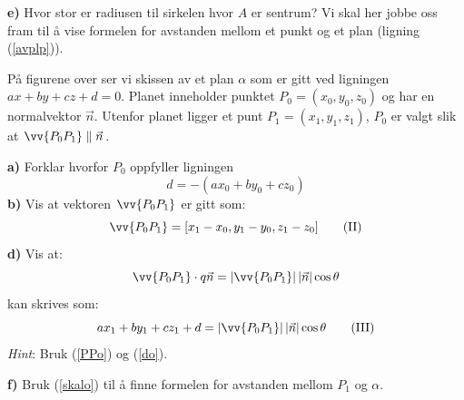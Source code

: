\textbf{e)} Hvor stor er radiusen til sirkelen hvor $ A $ er sentrum?
\newpage
\ekspop
Vi skal her jobbe oss fram til å vise formelen for avstanden mellom et punkt og et plan (ligning (\ref{avplp})).\vs
\begin{figure}[H]
	\centering
	\qquad\quad	
\end{figure}
På figurene over ser vi skissen av et plan $ \alpha $ som er gitt ved ligningen $ ax+by+cz+d=0 $. Planet inneholder punktet $ P_0=(x_0, y_0, z_0) $ og har en normalvektor $ \vec{n} $. Utenfor planet ligger et punt ${ P_1=(x_1, y_1, z_1) }$, $ P_0 $ er valgt slik at $ {\vv{P_0P_1}\parallel\vec{n}} $.\vsk

\textbf{a)} Forklar hvorfor $ P_0 $ oppfyller ligningen
\[ d=-(ax_0+by_0+cz_0) \tag{I}\label{do} \]
\textbf{b)} Vis at vektoren $ \vv{P_0P_1} $ er gitt som:
\[ \vv{P_0P_1} = [x_1-x_0, y_1-y_0, z_1-z_0] \tag{II}\label{PPo} \]
\textbf{d)} Vis at:
\[ \vv{P_0P_1}\cdot q\vec{n} = \left|\vv{P_0P_1}\right||\vec{n}|\cos \theta  \]kan skrives som:
\[ ax_1+by_1+cz_1+d= \left|\vv{P_0P_1}\right||\vec{n}|\cos \theta \tag{III} \label{skalo} \]
\textsl{Hint}: Bruk (\ref{PPo}) og (\ref{do}).\os

\textbf{f)} Bruk (\ref{skalo}) til å finne formelen for avstanden mellom $ P_1 $ og $ \alpha $.
